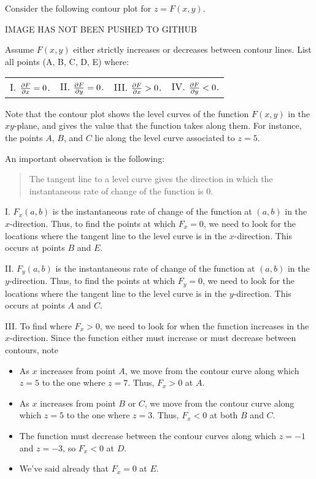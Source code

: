 \documentclass[noauthor,handout]{ximera}
\begin{document}

\begin{problem}
Consider the following contour plot for $z=F(x,y)$.
\begin{image}
  IMAGE HAS NOT BEEN PUSHED TO GITHUB
\end{image}
Assume $F(x,y)$ either strictly increases or decreases between contour lines.  List all points (\textsf{A}, \textsf{B}, \textsf{C}, \textsf{D},
\textsf{E}) where:

\begin{center}
\begin{tabular}{llll}
I. $\pp[F]{x}=0$.  \qquad \qquad &II. $\pp[F]{y}=0$. \qquad \qquad &III. $\pp[F]{x}>0$. \qquad \qquad &IV. $\pp[F]{y}<0$.
\end{tabular}
\end{center}

\begin{freeResponse}
Note that the contour plot shows the level curves of the function $F(x,y)$ in the $xy$-plane, and gives the value that the function takes along them.  For instance, the points $A$, $B$, and $C$ lie along the level curve associated to $z=5$.

An important observation is the following:

\begin{quote}
The tangent line to a level curve gives the direction in which the instantaneous rate of change of the function is $0$.
\end{quote}

I. $F_x(a,b)$ is the instantaneous rate of change of the function at $(a,b)$ in the $x$-direction.  Thus, to find the points at which $F_x=0$, we need to look for the locations where the tangent line to the level curve is in the $x$-direction.  This occurs at points $B$ and $E$.

II. $F_y(a,b)$ is the instantaneous rate of change of the function at $(a,b)$ in the $y$-direction.  Thus, to find the points at which $F_y=0$, we need to look for the locations where the tangent line to the level curve is in the $y$-direction.  This occurs at points $A$ and $C$.

III. To find where $F_x>0$, we need to look for when the function increases in the $x$-direction.  Since the function either must increase or must decrease between contours, note

\begin{itemize}
\item As $x$ increases from point $A$, we move from the contour curve along which $z=5$ to the one where $z=7$.  Thus, $F_x>0$ at $A$.
\item As $x$ increases from point $B$ or $C$, we move from the contour curve along which $z=5$ to the one where $z=3$.  Thus, $F_x<0$ at both $B$ and $C$.
\item The function must decrease between the contour curves along which $z=-1$ and $z=-3$, so $F_x<0$ at $D$.
\item We've said already that $F_x =0$ at $E$.
\end{itemize}


\end{freeResponse}
\end{problem}
\end{document}
